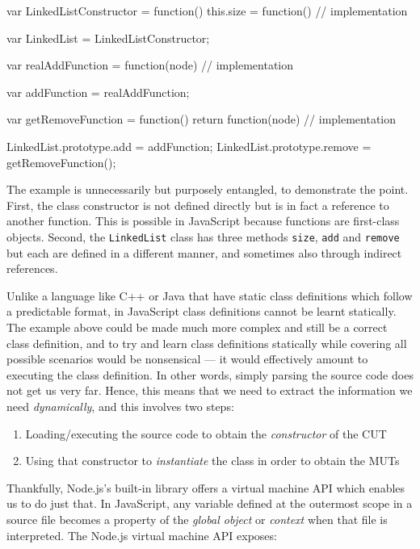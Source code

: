\begin{code}[caption=Runtime dependent class definition,label=runtimeclassdef]

var LinkedListConstructor = function() {
    this.size = function() {
        // implementation
    }
}

var LinkedList = LinkedListConstructor;

var realAddFunction = function(node) {
    // implementation
}

var addFunction = realAddFunction;

var getRemoveFunction = function() {
    return function(node) {
        // implementation
    }
}

LinkedList.prototype.add = addFunction;
LinkedList.prototype.remove = getRemoveFunction();
\end{code}

The example is unnecessarily but purposely entangled, to demonstrate the point. First, the class constructor is not defined directly but is in fact a reference to another function. This is possible in JavaScript because functions are first-class objects. Second, the \texttt{LinkedList} class has three methods \texttt{size}, \texttt{add} and \texttt{remove} but each are defined in a different manner, and sometimes also through indirect references.

Unlike a language like C++ or Java that have static class definitions which follow a predictable format, in JavaScript class definitions cannot be learnt statically. The example above could be made much more complex and still be a correct class definition, and to try and learn class definitions statically while covering all possible scenarios would be nonsensical --- it would effectively amount to executing the class definition. In other words, simply parsing the source code does not get us very far. Hence, this means that we need to extract the information we need \emph{dynamically}, and this involves two steps:

\begin{enumerate}
   \item Loading/executing the source code to obtain the \emph{constructor} of the CUT
   \item Using that constructor to \emph{instantiate} the class in order to obtain the MUTs
\end{enumerate}

Thankfully, Node.js's built-in library offers a virtual machine API which enables us to do just that. In JavaScript, any variable defined at the outermost scope in a source file becomes a property of the \emph{global object} or \emph{context} when that file is interpreted. The Node.js virtual machine API exposes:\\

